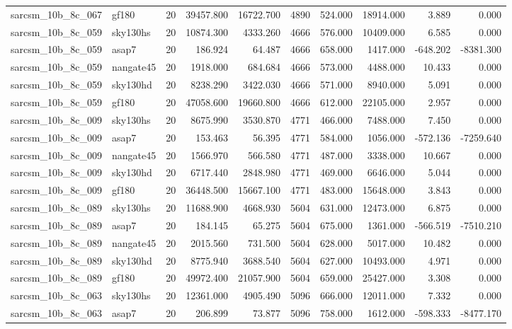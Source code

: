 \begin{longtable}{llrrrrrrrr}
sarcsm\_10b\_8c\_067 & gf180 & 20 & 39457.800 & 16722.700 & 4890 & 524.000 & 18914.000 & 3.889 & 0.000 \\
sarcsm\_10b\_8c\_059 & sky130hs & 20 & 10874.300 & 4333.260 & 4666 & 576.000 & 10409.000 & 6.585 & 0.000 \\
sarcsm\_10b\_8c\_059 & asap7 & 20 & 186.924 & 64.487 & 4666 & 658.000 & 1417.000 & -648.202 & -8381.300 \\
sarcsm\_10b\_8c\_059 & nangate45 & 20 & 1918.000 & 684.684 & 4666 & 573.000 & 4488.000 & 10.433 & 0.000 \\
sarcsm\_10b\_8c\_059 & sky130hd & 20 & 8238.290 & 3422.030 & 4666 & 571.000 & 8940.000 & 5.091 & 0.000 \\
sarcsm\_10b\_8c\_059 & gf180 & 20 & 47058.600 & 19660.800 & 4666 & 612.000 & 22105.000 & 2.957 & 0.000 \\
sarcsm\_10b\_8c\_009 & sky130hs & 20 & 8675.990 & 3530.870 & 4771 & 466.000 & 7488.000 & 7.450 & 0.000 \\
sarcsm\_10b\_8c\_009 & asap7 & 20 & 153.463 & 56.395 & 4771 & 584.000 & 1056.000 & -572.136 & -7259.640 \\
sarcsm\_10b\_8c\_009 & nangate45 & 20 & 1566.970 & 566.580 & 4771 & 487.000 & 3338.000 & 10.667 & 0.000 \\
sarcsm\_10b\_8c\_009 & sky130hd & 20 & 6717.440 & 2848.980 & 4771 & 469.000 & 6646.000 & 5.044 & 0.000 \\
sarcsm\_10b\_8c\_009 & gf180 & 20 & 36448.500 & 15667.100 & 4771 & 483.000 & 15648.000 & 3.843 & 0.000 \\
sarcsm\_10b\_8c\_089 & sky130hs & 20 & 11688.900 & 4668.930 & 5604 & 631.000 & 12473.000 & 6.875 & 0.000 \\
sarcsm\_10b\_8c\_089 & asap7 & 20 & 184.145 & 65.275 & 5604 & 675.000 & 1361.000 & -566.519 & -7510.210 \\
sarcsm\_10b\_8c\_089 & nangate45 & 20 & 2015.560 & 731.500 & 5604 & 628.000 & 5017.000 & 10.482 & 0.000 \\
sarcsm\_10b\_8c\_089 & sky130hd & 20 & 8775.940 & 3688.540 & 5604 & 627.000 & 10493.000 & 4.971 & 0.000 \\
sarcsm\_10b\_8c\_089 & gf180 & 20 & 49972.400 & 21057.900 & 5604 & 659.000 & 25427.000 & 3.308 & 0.000 \\
sarcsm\_10b\_8c\_063 & sky130hs & 20 & 12361.000 & 4905.490 & 5096 & 666.000 & 12011.000 & 7.332 & 0.000 \\
sarcsm\_10b\_8c\_063 & asap7 & 20 & 206.899 & 73.877 & 5096 & 758.000 & 1612.000 & -598.333 & -8477.170 \\

\end{longtable}
